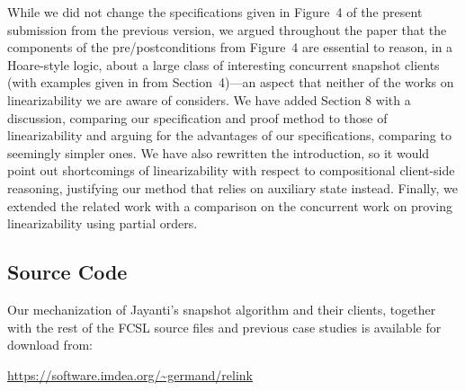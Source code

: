 \documentclass[a4paper,USenglish]{lipics-v2016}
\begin{document}
\vspace{10pt}

\noindent
%
While we did not change the specifications given in Figure~4 of the
present submission from the previous version, we argued throughout the
paper that the components of the pre/postconditions from Figure~4 are
essential to reason, in a Hoare-style logic, about a large class of
interesting concurrent snapshot clients (with examples given in from
Section~4)---an aspect that neither of the works on linearizability we
are aware of considers.
%
We have added Section 8 with a discussion, comparing our specification
and proof method to those of linearizability and arguing for the
advantages of our specifications, comparing to seemingly simpler ones.
%
We have also rewritten the introduction, so it would point out
shortcomings of linearizability with respect to compositional
client-side reasoning, justifying our method that relies on auxiliary
state instead. 
%
Finally, we extended the related work with a comparison on the
concurrent work on proving linearizability using partial orders.



\subsection*{Source Code}

Our mechanization of Jayanti's snapshot algorithm and their clients,
together with the rest of the FCSL source files and previous case
studies is available for download from:

\begin{center}
  \url{https://software.imdea.org/~germand/relink}
\end{center}

\end{document}
